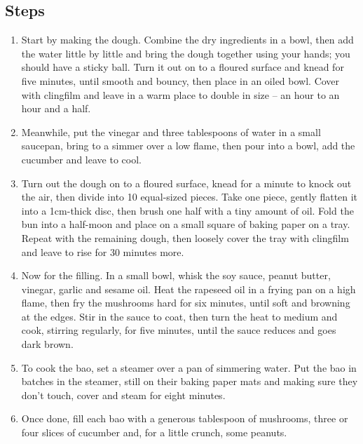 \documentclass{book}
\begin{document}
\subsection*{Steps}
\begin{enumerate}
\item Start by making the dough. Combine the dry ingredients in a bowl, then add the water little by little and bring the dough together using your hands; you should have a sticky ball. Turn it out on to a floured surface and knead for five minutes, until smooth and bouncy, then place in an oiled bowl. Cover with clingfilm and leave in a warm place to double in size – an hour to an hour and a half.
\item Meanwhile, put the vinegar and three tablespoons of water in a small saucepan, bring to a simmer over a low flame, then pour into a bowl, add the cucumber and leave to cool.
\item Turn out the dough on to a floured surface, knead for a minute to knock out the air, then divide into 10 equal-sized pieces. Take one piece, gently flatten it into a 1cm-thick disc, then brush one half with a tiny amount of oil. Fold the bun into a half-moon and place on a small square of baking paper on a tray. Repeat with the remaining dough, then loosely cover the tray with clingfilm and leave to rise for 30 minutes more.
\item Now for the filling. In a small bowl, whisk the soy sauce, peanut butter, vinegar, garlic and sesame oil. Heat the rapeseed oil in a frying pan on a high flame, then fry the mushrooms hard for six minutes, until soft and browning at the edges. Stir in the sauce to coat, then turn the heat to medium and cook, stirring regularly, for five minutes, until the sauce reduces and goes dark brown.
\item To cook the bao, set a steamer over a pan of simmering water. Put the bao in batches in the steamer, still on their baking paper mats and making sure they don’t touch, cover and steam for eight minutes.
\item Once done, fill each bao with a generous tablespoon of mushrooms, three or four slices of cucumber and, for a little crunch, some peanuts.
\end{enumerate}
\newpage
\end{document}
